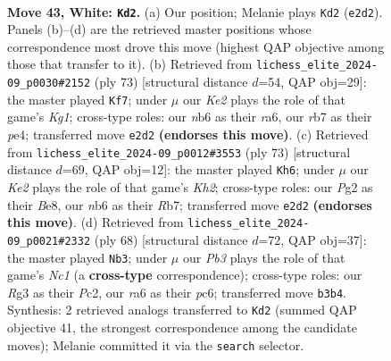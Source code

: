 \documentclass[11pt]{article}
\begin{document}
\clearpage

\begin{figure}[p]\centering
\begin{subfigure}{0.46\textwidth}\centering
\resizebox{\linewidth}{!}{%
\newchessgame
\chessboard[
  setfen={5k2/1r3p1p/rn4p1/p3p1P1/P3P3/1P4RP/4K1P1/RN6 w - - 0 43},
  showmover=false,
  pgfstyle=straightmove, color=movearrow, markmove={e2-d2}
]}
\caption{}
\end{subfigure}\hfill
\begin{subfigure}{0.46\textwidth}\centering
\resizebox{\linewidth}{!}{%
\newchessgame
\chessboard[
  setfen={6k1/3r2pp/R2p1p2/1p1N1P2/3RP1PP/3P4/1r1b4/7K b - - 0 37},
  showmover=false,
  pgfstyle=straightmove, color=movearrow, markmove={g8-f7}
]}
\caption{}
\end{subfigure}
\\[4pt]
\begin{subfigure}{0.46\textwidth}\centering
\resizebox{\linewidth}{!}{%
\newchessgame
\chessboard[
  setfen={1r2b3/1r4pk/2p2p2/2P1pP2/2B1P2p/7P/1PRR2P1/7K b - - 1 37},
  showmover=false,
  pgfstyle=straightmove, color=movearrow, markmove={h7-h6}
]}
\caption{}
\end{subfigure}\hfill
\begin{subfigure}{0.46\textwidth}\centering
\resizebox{\linewidth}{!}{%
\newchessgame
\chessboard[
  setfen={8/2k2rp1/2p2p1p/p1n1p3/P3P1PP/K3RP2/2P5/2N5 w - - 0 35},
  showmover=false,
  pgfstyle=straightmove, color=movearrow, markmove={c1-b3}
]}
\caption{}
\end{subfigure}
\caption{\textbf{Move 43, White: \texttt{Kd2}.} (a) Our position; Melanie plays \texttt{Kd2} (\texttt{e2d2}). Panels (b)--(d) are the retrieved master positions whose correspondence most drove this move (highest QAP objective among those that transfer to it). (b) Retrieved from \texttt{lichess\_elite\_2024-09\_p0030\#2152} (ply 73) [structural distance $d$=54, QAP obj=29]: the master played \texttt{Kf7}; under $\mu$ our \emph{Ke2} plays the role of that game's \emph{Kg1}; cross-type roles: our \emph{n}b6 as their \emph{r}a6, our \emph{r}b7 as their \emph{p}e4; transferred move \texttt{e2d2} \textbf{(endorses this move)}. (c) Retrieved from \texttt{lichess\_elite\_2024-09\_p0012\#3553} (ply 73) [structural distance $d$=69, QAP obj=12]: the master played \texttt{Kh6}; under $\mu$ our \emph{Ke2} plays the role of that game's \emph{Kh2}; cross-type roles: our \emph{P}g2 as their \emph{B}e8, our \emph{n}b6 as their \emph{R}b7; transferred move \texttt{e2d2} \textbf{(endorses this move)}. (d) Retrieved from \texttt{lichess\_elite\_2024-09\_p0021\#2332} (ply 68) [structural distance $d$=72, QAP obj=37]: the master played \texttt{Nb3}; under $\mu$ our \emph{Pb3} plays the role of that game's \emph{Nc1} (a \textbf{cross-type} correspondence); cross-type roles: our \emph{R}g3 as their \emph{P}c2, our \emph{r}a6 as their \emph{p}c6; transferred move \texttt{b3b4}. Synthesis: 2 retrieved analogs transferred to \texttt{Kd2} (summed QAP objective 41, the strongest correspondence among the candidate moves); Melanie committed it via the \texttt{search} selector.}
\label{fig:thought-m84}
\end{figure}
\end{document}
